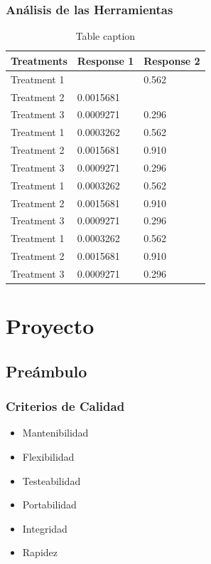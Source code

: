 \documentclass{beamer}
\newcommand{\cmark}{\ding{51}}%
\newcommand{\xmark}{\ding{55}}%
\begin{document}
\begin{frame}
\frametitle{Análisis de las Herramientas}
\begin{table}
\begin{tabular}{l l l}
\toprule
\textbf{Treatments} & \textbf{Response 1} & \textbf{Response 2}\\
\midrule
Treatment 1 & \cmark & 0.562 \\
Treatment 2 & 0.0015681 & \xmark \\
Treatment 3 & 0.0009271 & 0.296 \\
Treatment 1 & 0.0003262 & 0.562 \\
Treatment 2 & 0.0015681 & 0.910 \\
Treatment 3 & 0.0009271 & 0.296 \\
Treatment 1 & 0.0003262 & 0.562 \\
Treatment 2 & 0.0015681 & 0.910 \\
Treatment 3 & 0.0009271 & 0.296 \\
Treatment 1 & 0.0003262 & 0.562 \\
Treatment 2 & 0.0015681 & 0.910 \\
Treatment 3 & 0.0009271 & 0.296 \\
\bottomrule
\end{tabular}
\caption{Table caption}
\end{table}
\end{frame}


\section{Proyecto}

\subsection{Preámbulo}


\begin{frame}
\frametitle{Criterios de Calidad}
\begin{itemize}
\item Mantenibilidad
\item Flexibilidad
\item Testeabilidad
\item Portabilidad
\item Integridad
\item Rapidez
\end{itemize}
\end{frame}
\end{document}
